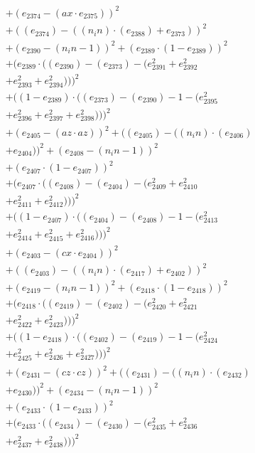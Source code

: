 \documentclass[10pt, a4paper]{article}
\begin{document}
\begin{small}
\begin{align*}
& + (e_{2374} - (ax  \cdot  e_{2375}))^{2} \\
& + ((e_{2374}) - ((n_in)  \cdot  (e_{2388}) + e_{2373}))^{2} \\
& + (e_{2390} - (n_in - 1))^{2} + (e_{2389}  \cdot  (1 - e_{2389}))^{2} \\
& + (e_{2389}  \cdot  ((e_{2390}) - (e_{2373}) - (e_{2391}^{2} + e_{2392}^{2} \\
& + e_{2393}^{2} + e_{2394}^{2})))^{2} \\
& + ((1 - e_{2389})  \cdot  ((e_{2373}) - (e_{2390}) - 1 - (e_{2395}^{2} \\
& + e_{2396}^{2} + e_{2397}^{2} + e_{2398}^{2})))^{2} \\
& + (e_{2405} - (az  \cdot  az))^{2} + ((e_{2405}) - ((n_in)  \cdot  (e_{2406}) \\
& + e_{2404}))^{2} + (e_{2408} - (n_in - 1))^{2} \\
& + (e_{2407}  \cdot  (1 - e_{2407}))^{2} \\
& + (e_{2407}  \cdot  ((e_{2408}) - (e_{2404}) - (e_{2409}^{2} + e_{2410}^{2} \\
& + e_{2411}^{2} + e_{2412}^{2})))^{2} \\
& + ((1 - e_{2407})  \cdot  ((e_{2404}) - (e_{2408}) - 1 - (e_{2413}^{2} \\
& + e_{2414}^{2} + e_{2415}^{2} + e_{2416}^{2})))^{2} \\
& + (e_{2403} - (cx  \cdot  e_{2404}))^{2} \\
& + ((e_{2403}) - ((n_in)  \cdot  (e_{2417}) + e_{2402}))^{2} \\
& + (e_{2419} - (n_in - 1))^{2} + (e_{2418}  \cdot  (1 - e_{2418}))^{2} \\
& + (e_{2418}  \cdot  ((e_{2419}) - (e_{2402}) - (e_{2420}^{2} + e_{2421}^{2} \\
& + e_{2422}^{2} + e_{2423}^{2})))^{2} \\
& + ((1 - e_{2418})  \cdot  ((e_{2402}) - (e_{2419}) - 1 - (e_{2424}^{2} \\
& + e_{2425}^{2} + e_{2426}^{2} + e_{2427}^{2})))^{2} \\
& + (e_{2431} - (cz  \cdot  cz))^{2} + ((e_{2431}) - ((n_in)  \cdot  (e_{2432}) \\
& + e_{2430}))^{2} + (e_{2434} - (n_in - 1))^{2} \\
& + (e_{2433}  \cdot  (1 - e_{2433}))^{2} \\
& + (e_{2433}  \cdot  ((e_{2434}) - (e_{2430}) - (e_{2435}^{2} + e_{2436}^{2} \\
& + e_{2437}^{2} + e_{2438}^{2})))^{2} \\

\end{align*}
\end{small}
\end{document}
